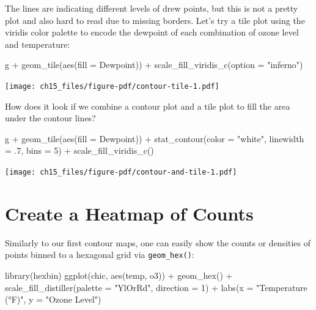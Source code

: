 \documentclass[
  letterpaper,
]{scrbook}
\newenvironment{Shaded}{\begin{snugshade}}{\end{snugshade}}
\newcommand{\AttributeTok}[1]{\textcolor[rgb]{0.40,0.45,0.13}{#1}}
\newcommand{\DecValTok}[1]{\textcolor[rgb]{0.68,0.00,0.00}{#1}}
\newcommand{\FunctionTok}[1]{\textcolor[rgb]{0.28,0.35,0.67}{#1}}
\newcommand{\NormalTok}[1]{\textcolor[rgb]{0.00,0.23,0.31}{#1}}
\newcommand{\SpecialCharTok}[1]{\textcolor[rgb]{0.37,0.37,0.37}{#1}}
\newcommand{\StringTok}[1]{\textcolor[rgb]{0.13,0.47,0.30}{#1}}
\begin{document}
The lines are indicating different levels of drew points, but this is
not a pretty plot and also hard to read due to missing borders. Let's
try a tile plot using the viridis color palette to encode the dewpoint
of each combination of ozone level and temperature:

\begin{Shaded}
\begin{Highlighting}[]
\NormalTok{g }\SpecialCharTok{+} \FunctionTok{geom\_tile}\NormalTok{(}\FunctionTok{aes}\NormalTok{(}\AttributeTok{fill =}\NormalTok{ Dewpoint)) }\SpecialCharTok{+}
    \FunctionTok{scale\_fill\_viridis\_c}\NormalTok{(}\AttributeTok{option =} \StringTok{"inferno"}\NormalTok{)}
\end{Highlighting}
\end{Shaded}

\texttt{[image: ch15\_files/figure-pdf/contour-tile-1.pdf]}

How does it look if we combine a contour plot and a tile plot to fill
the area under the contour lines?

\begin{Shaded}
\begin{Highlighting}[]
\NormalTok{g }\SpecialCharTok{+} \FunctionTok{geom\_tile}\NormalTok{(}\FunctionTok{aes}\NormalTok{(}\AttributeTok{fill =}\NormalTok{ Dewpoint)) }\SpecialCharTok{+}
    \FunctionTok{stat\_contour}\NormalTok{(}\AttributeTok{color =} \StringTok{"white"}\NormalTok{, }\AttributeTok{linewidth =}\NormalTok{ .}\DecValTok{7}\NormalTok{, }\AttributeTok{bins =} \DecValTok{5}\NormalTok{) }\SpecialCharTok{+}
    \FunctionTok{scale\_fill\_viridis\_c}\NormalTok{()}
\end{Highlighting}
\end{Shaded}

\texttt{[image: ch15\_files/figure-pdf/contour-and-tile-1.pdf]}

\section{Create a Heatmap of Counts}\label{create-a-heatmap-of-counts}

Similarly to our first contour maps, one can easily show the counts or
densities of points binned to a hexagonal grid via \texttt{geom\_hex()}:

\begin{Shaded}
\begin{Highlighting}[]
\FunctionTok{library}\NormalTok{(hexbin)}
\FunctionTok{ggplot}\NormalTok{(chic, }\FunctionTok{aes}\NormalTok{(temp, o3)) }\SpecialCharTok{+}
  \FunctionTok{geom\_hex}\NormalTok{() }\SpecialCharTok{+}
  \FunctionTok{scale\_fill\_distiller}\NormalTok{(}\AttributeTok{palette =} \StringTok{"YlOrRd"}\NormalTok{, }\AttributeTok{direction =} \DecValTok{1}\NormalTok{) }\SpecialCharTok{+}
  \FunctionTok{labs}\NormalTok{(}\AttributeTok{x =} \StringTok{"Temperature (°F)"}\NormalTok{, }\AttributeTok{y =} \StringTok{"Ozone Level"}\NormalTok{)}
\end{Highlighting}
\end{Shaded}
\end{document}
